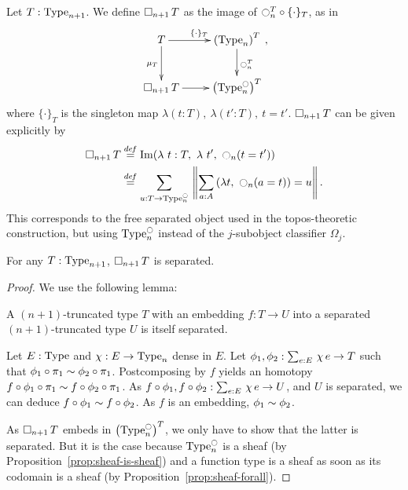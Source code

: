 Let $T : \operatorname{Type}_{n+1}$. We define $\mathop{\square_{n+1}} T$ as the image of
$\ocircle_n^T \circ \{\cdot\}_T$, as in
\[\xymatrix{
    T \ar[r]^{\{\cdot\}_T} \ar[d]_{\mu_T} & \left(\Type_n\right)^T \ar[d]^{\modal_n^T} \\
  \separated T \ar[r]& \left( \Type_n^\modal \right)^T
}, \]%
where $\{\cdot\}_T$ is the singleton map $\lambda (t:T),~\lambda
(t':T),~t=t'$. 
%
$\mathop{\square_{n+1}} T$ can be given explicitly by
%
\begin{align*}
\mathop{\square_{n+1}} T &\overset{de\hspace{-0.2ex}f}{=} \operatorname{Im} (\lambda~t:T,~\lambda~ t',~ \ocircle_n (t = t')) \\
          &\overset{de\hspace{-0.2ex}f}{=} \sum_{u:T \to \operatorname{Type}_n^{\ocircle}}\, \left\| \sum_{a:A}\, (\lambda t,~\ocircle_n (a=t)) = u\right\|.
\end{align*}
%
This corresponds to the free separated object used in the topos-theoretic construction, but using $\operatorname{Type}_n^{\ocircle}$ instead of the
$j$-subobject classifier $\Omega_j$.
%
\begin{prop}
  For any $T:\operatorname{Type}_{n+1}$, $\mathop{\square_{n+1}} T$ is separated.  
\end{prop}

\begin{proof}
We use the following lemma:
\begin{lem}
  A $(n+1)$-truncated type $T$ with an embedding $f : T \to U$
  into a separated $(n+1)$-truncated type $U$ is itself separated.
\end{lem}
\begin{prooflem}
  Let $E:\operatorname{Type}$ and $\chi:E\to\operatorname{Type}_n$ dense in $E$. Let
  $\phi_1,\phi_2:\sum_{e:E}\, \chi\, e \to T$ such that $\phi_1 \circ
  \pi_1 \sim \phi_2 \circ \pi_1$. Postcomposing by $f$ yields an homotopy $f \circ \phi_1 \circ
  \pi_1 \sim f \circ \phi_2 \circ \pi_1$. As $f\circ\phi_1,f\circ
  \phi_2 : \sum_{e:E}\, \chi\, e \to U$, and $U$ is separated, we can
  deduce $f \circ \phi_1 \sim f \circ \phi_2$. As $f$ is an
  embedding, $\phi_1 \sim \phi_2$.
\end{prooflem}
As $\mathop{\square_{n+1}} T$ embeds in $\left( \operatorname{Type}_n^{\ocircle} \right)^T$, we only
have to show that the latter is separated. But it is the case because
$\operatorname{Type}_n^{\ocircle}$ is a sheaf (by Proposition~\ref{prop:sheaf-is-sheaf})
and a function type is a sheaf as soon
as its codomain is a sheaf (by Proposition~\ref{prop:sheaf-forall}).
\end{proof}

